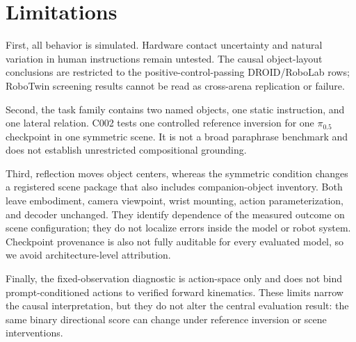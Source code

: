 \section{Limitations}
\label{sec:limitations}

First, all behavior is simulated. Hardware contact uncertainty and natural variation in human instructions remain untested. The causal object-layout conclusions are restricted to the positive-control-passing DROID/RoboLab rows; RoboTwin screening results cannot be read as cross-arena replication or failure.

Second, the task family contains two named objects, one static instruction, and one lateral relation. C002 tests one controlled reference inversion for one $\pi_{0.5}$ checkpoint in one symmetric scene. It is not a broad paraphrase benchmark and does not establish unrestricted compositional grounding.

Third, reflection moves object centers, whereas the symmetric condition changes a registered scene package that also includes companion-object inventory. Both leave embodiment, camera viewpoint, wrist mounting, action parameterization, and decoder unchanged. They identify dependence of the measured outcome on scene configuration; they do not localize errors inside the model or robot system. Checkpoint provenance is also not fully auditable for every evaluated model, so we avoid architecture-level attribution.

Finally, the fixed-observation diagnostic is action-space only and does not bind prompt-conditioned actions to verified forward kinematics. These limits narrow the causal interpretation, but they do not alter the central evaluation result: the same binary directional score can change under reference inversion or scene interventions.
